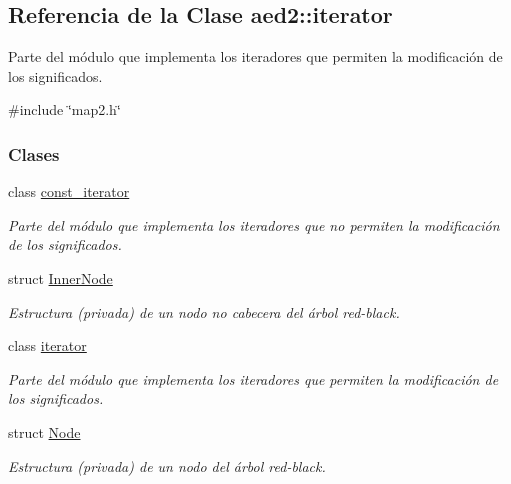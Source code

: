\hypertarget{classaed2_1_1iterator}{\subsection{\-Referencia de la \-Clase aed2\-:\-:iterator}
\label{classaed2_1_1iterator}
}


\-Parte del módulo que implementa los iteradores que permiten la modificación de los significados.  




{\ttfamily \#include \char`\"{}map2.\-h\char`\"{}}

\subsubsection*{\-Clases}
\begin{DoxyCompactItemize}
\item 
class \hyperlink{classaed2_1_1iterator_1_1const__iterator}{const\-\_\-iterator}
\begin{DoxyCompactList}\small\item\em \-Parte del módulo que implementa los iteradores que no permiten la modificación de los significados. \end{DoxyCompactList}\item 
struct \hyperlink{structaed2_1_1iterator_1_1InnerNode}{\-Inner\-Node}
\begin{DoxyCompactList}\small\item\em \-Estructura (privada) de un nodo no cabecera del árbol red-\/black. \end{DoxyCompactList}\item 
class \hyperlink{classaed2_1_1iterator_1_1iterator}{iterator}
\begin{DoxyCompactList}\small\item\em \-Parte del módulo que implementa los iteradores que permiten la modificación de los significados. \end{DoxyCompactList}\item 
struct \hyperlink{structaed2_1_1iterator_1_1Node}{\-Node}
\begin{DoxyCompactList}\small\item\em \-Estructura (privada) de un nodo del árbol red-\/black. \end{DoxyCompactList}\end{DoxyCompactItemize}
